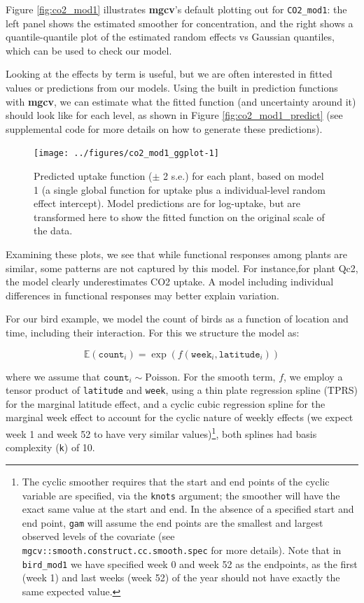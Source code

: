 \documentclass[12pt]{article}
\let\rmarkdownfootnote\footnote%
\def\footnote{\protect\rmarkdownfootnote}
\begin{document}
Figure \ref{fig:co2_mod1} illustrates \textbf{mgcv}'s default plotting
out for \texttt{CO2\_mod1}: the left panel shows the estimated smoother
for concentration, and the right shows a quantile-quantile plot of the
estimated random effects vs Gaussian quantiles, which can be used to
check our model.

Looking at the effects by term is useful, but we are often interested in
fitted values or predictions from our models. Using the built in
prediction functions with \textbf{mgcv}, we can estimate what the fitted
function (and uncertainty around it) should look like for each level, as
shown in Figure \ref{fig:co2_mod1_predict} (see supplemental code for
more details on how to generate these predictions).

\begin{figure}
\texttt{[image: ../figures/co2\_mod1\_ggplot-1]} \caption{\label{fig:co2_mod1_predict} Predicted uptake function ($\pm$ 2 s.e.) for each plant, based on model 1 (a single global function for uptake plus a individual-level random effect intercept). Model predictions are for log-uptake, but are transformed here to show the fitted function on the original scale of the data.}\label{fig:co2_mod1_ggplot}
\end{figure}

Examining these plots, we see that while functional responses among
plants are similar, some patterns are not captured by this model. For
instance,for plant Qc2, the model clearly underestimates CO2 uptake. A
model including individual differences in functional responses may
better explain variation.

For our bird example, we model the count of birds as a function of
location and time, including their interaction. For this we structure
the model as:

\[
\mathbb{E}(\texttt{count}_i) = \exp(f(\texttt{week}_i, \texttt{latitude}_i))
\]

where we assume that \(\texttt{count}_i \sim\text{Poisson}\). For the
smooth term, \(f\), we employ a tensor product of \texttt{latitude} and
\texttt{week}, using a thin plate regression spline (TPRS) for the
marginal latitude effect, and a cyclic cubic regression spline for the
marginal week effect to account for the cyclic nature of weekly effects
(we expect week 1 and week 52 to have very similar values)\footnote{The
  cyclic smoother requires that the start and end points of the cyclic
  variable are specified, via the \texttt{knots} argument; the smoother
  will have the exact same value at the start and end. In the absence of
  a specified start and end point, \texttt{gam} will assume the end
  points are the smallest and largest observed levels of the covariate
  (see \texttt{mgcv::smooth.construct.cc.smooth.spec} for more details).
  Note that in \texttt{bird\_mod1} we have specified week 0 and week 52
  as the endpoints, as the first (week 1) and last weeks (week 52) of
  the year should not have exactly the same expected value.}, both
splines had basis complexity (\texttt{k}) of 10.
\end{document}
